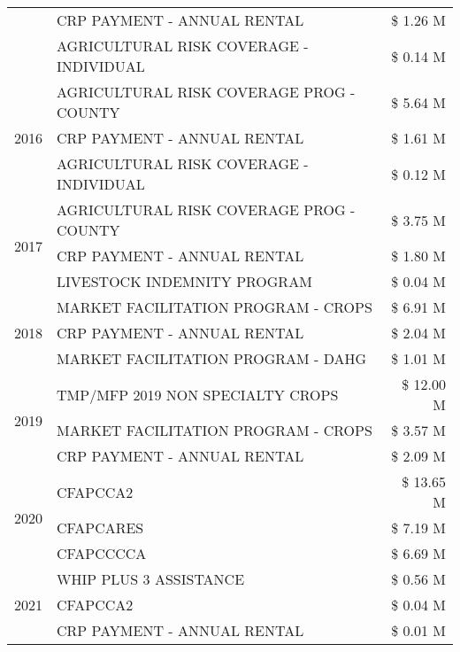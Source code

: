\begin{tabular}{llr}
 & CRP PAYMENT - ANNUAL RENTAL & \$ 1.26 M \\
 & AGRICULTURAL RISK COVERAGE - INDIVIDUAL & \$ 0.14 M \\
\cline{1-3}
\multirow[t]{3}{*}{2016} & AGRICULTURAL RISK COVERAGE PROG - COUNTY & \$ 5.64 M \\
 & CRP PAYMENT - ANNUAL RENTAL & \$ 1.61 M \\
 & AGRICULTURAL RISK COVERAGE - INDIVIDUAL & \$ 0.12 M \\
\cline{1-3}
\multirow[t]{3}{*}{2017} & AGRICULTURAL RISK COVERAGE PROG - COUNTY & \$ 3.75 M \\
 & CRP PAYMENT - ANNUAL RENTAL & \$ 1.80 M \\
 & LIVESTOCK INDEMNITY PROGRAM & \$ 0.04 M \\
\cline{1-3}
\multirow[t]{3}{*}{2018} & MARKET FACILITATION PROGRAM - CROPS & \$ 6.91 M \\
 & CRP PAYMENT - ANNUAL RENTAL & \$ 2.04 M \\
 & MARKET FACILITATION PROGRAM - DAHG & \$ 1.01 M \\
\cline{1-3}
\multirow[t]{3}{*}{2019} & TMP/MFP 2019 NON SPECIALTY CROPS & \$ 12.00 M \\
 & MARKET FACILITATION PROGRAM - CROPS & \$ 3.57 M \\
 & CRP PAYMENT - ANNUAL RENTAL & \$ 2.09 M \\
\cline{1-3}
\multirow[t]{3}{*}{2020} & CFAPCCA2 & \$ 13.65 M \\
 & CFAPCARES & \$ 7.19 M \\
 & CFAPCCCCA & \$ 6.69 M \\
\cline{1-3}
\multirow[t]{3}{*}{2021} & WHIP PLUS 3 ASSISTANCE & \$ 0.56 M \\
 & CFAPCCA2 & \$ 0.04 M \\
 & CRP PAYMENT - ANNUAL RENTAL & \$ 0.01 M \\
\cline{1-3}
\bottomrule
\end{tabular}
